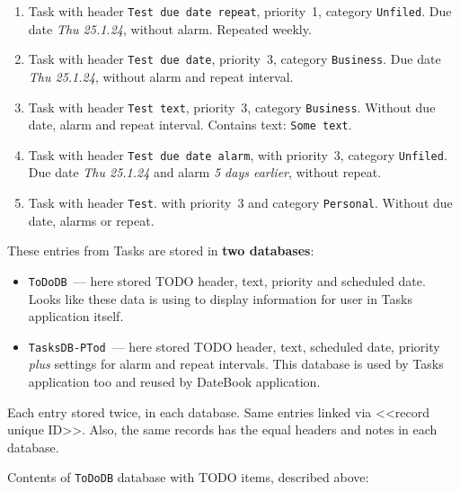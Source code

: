 \documentclass[a4paper,12pt,oneside]{scrartcl}
\begin{document}
\begin{enumerate}
\item Task with header \texttt{Test due date repeat}, priority~1, category
  \texttt{Unfiled}. Due date \textit{Thu 25.1.24}, without alarm. Repeated
  weekly.
\item Task with header \texttt{Test due date}, priority~3, category
  \texttt{Business}. Due date \textit{Thu 25.1.24}, without alarm and repeat interval.
\item Task with header \texttt{Test text}, priority~3, category
  \texttt{Business}. Without due date, alarm and repeat interval. Contains text:
  \texttt{Some text}.
\item Task with header \texttt{Test due date alarm}, with priority~3, category
  \texttt{Unfiled}. Due date \textit{Thu 25.1.24} and alarm \textit{5 days
    earlier}, without repeat.
\item Task with header \texttt{Test}. with priority~3 and category
  \texttt{Personal}. Without due date, alarms or repeat.
\end{enumerate}

These entries from Tasks are stored in \textbf{two databases}:
\begin{itemize}
\item \texttt{ToDoDB}~--- here stored TODO header, text, priority and scheduled
  date. Looks like these data is using to display information for user in Tasks
  application itself.
\item \texttt{TasksDB-PTod}~--- here stored TODO header, text, scheduled date,
  priority \textit{plus} settings for alarm and repeat intervals. This database
  is used by Tasks application too and reused by DateBook application.
\end{itemize}

Each entry stored twice, in each database. Same entries linked via <<record
unique ID>>. Also, the same records has the equal headers and notes in each
database.


Contents of \texttt{ToDoDB} database with TODO items, described above:
\end{document}

